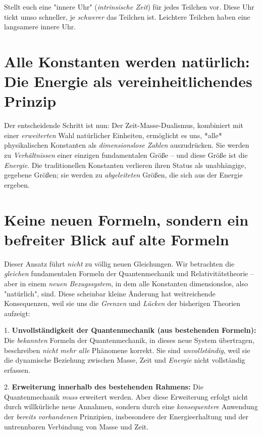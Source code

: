 \documentclass[a4paper,12pt]{article}
\begin{document}
	Stellt euch eine "innere Uhr" (\emph{intrinsische Zeit}) für jedes Teilchen vor. Diese Uhr tickt umso schneller, je \emph{schwerer} das Teilchen ist. Leichtere Teilchen haben eine langsamere innere Uhr.
	
	\section{Alle Konstanten werden natürlich: Die Energie als vereinheitlichendes Prinzip}
	
	Der entscheidende Schritt ist nun: Der Zeit-Masse-Dualismus, kombiniert mit einer \emph{erweiterten} Wahl natürlicher Einheiten, ermöglicht es uns, *alle* physikalischen Konstanten als \emph{dimensionslose Zahlen} auszudrücken. Sie werden zu \emph{Verhältnissen} einer einzigen fundamentalen Größe – und diese Größe ist die \emph{Energie}. Die traditionellen Konstanten verlieren ihren Status als unabhängige, gegebene Größen; sie werden zu \emph{abgeleiteten} Größen, die sich aus der Energie ergeben.
	
	\section{Keine neuen Formeln, sondern ein befreiter Blick auf alte Formeln}
	
	Dieser Ansatz führt \emph{nicht} zu völlig neuen Gleichungen. Wir betrachten die \emph{gleichen} fundamentalen Formeln der Quantenmechanik und Relativitätstheorie – aber in einem \emph{neuen Bezugssystem}, in dem alle Konstanten dimensionslos, also "natürlich", sind. Diese scheinbar kleine Änderung hat weitreichende Konsequenzen, weil sie uns die \emph{Grenzen} und \emph{Lücken} der bisherigen Theorien aufzeigt:
	
	1.  \textbf{Unvollständigkeit der Quantenmechanik (aus bestehenden Formeln):} Die \emph{bekannten} Formeln der Quantenmechanik, in dieses neue System übertragen, beschreiben \emph{nicht mehr alle} Phänomene korrekt. Sie sind \emph{unvollständig}, weil sie die dynamische Beziehung zwischen Masse, Zeit und \emph{Energie} nicht vollständig erfassen.
	
	2.  \textbf{Erweiterung innerhalb des bestehenden Rahmens:} Die Quantenmechanik \emph{muss} erweitert werden. Aber diese Erweiterung erfolgt nicht durch willkürliche neue Annahmen, sondern durch eine \emph{konsequentere} Anwendung der \emph{bereits vorhandenen} Prinzipien, insbesondere der Energieerhaltung und der untrennbaren Verbindung von Masse und Zeit.
	
\end{document}
